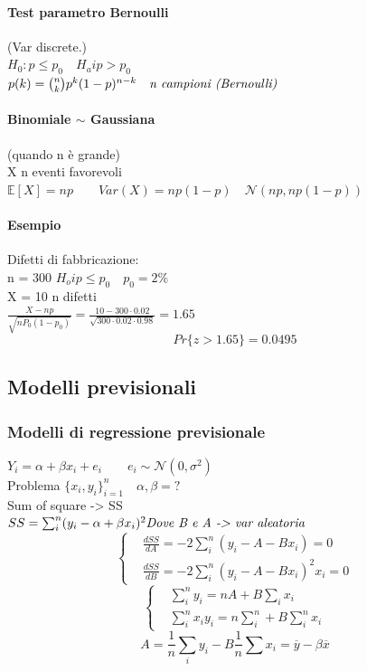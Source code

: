 \documentclass[]{article}
\newcommand{\ev}{\mathbb{E}[X]}
\renewcommand{\ev}[1]{\mathbb{E}\left[#1\right]}
\begin{document}
    \paragraph{Test parametro Bernoulli} (Var discrete.) \\
    $H_0 : p \leq p_0 \quad H_a i p > p_0$ \\[2ex]
    $p(k) = \binom{n}{k} p^k (1-p)^{n-k} \quad \text{\textit{n campioni (Bernoulli)}}$ \\[4ex]
    \paragraph{Binomiale $\sim$ Gaussiana} (quando n è grande) \\
    X n eventi favorevoli \\
    $\ev{X} = np \qquad Var(X) = np(1-p) \quad \mathcal{N}(np, np(1-p))$
    \paragraph{Esempio} Difetti di fabbricazione: \\
    n = 300 $H_o i p \leq p_0 \quad p_0 = 2\%$ \\
    X = 10 n difetti \\[2ex]
    $\displaystyle\frac{X-np}{\sqrt{nP_0(1-p_0)}} = \frac{10-300 \cdot 0.02}{\sqrt{300 \cdot 0.02 \cdot 0.98}} = 1.65$
    \[ Pr \{ z > 1.65 \} = 0.0495 \]
    \subsection{Modelli previsionali}
    \subsubsection{Modelli di regressione previsionale}
    $Y_i = \alpha + \beta x_i + e_i  \qquad e_i \sim \mathcal{N}(0, \sigma^2)$ \\[4ex]
    Problema $\{ x_i, y_i \}^n_{i=1} \quad \alpha, \beta = ?$ \\[4ex]
    Sum of square -> SS \\
    $SS = \sum_{i}^{n} (y_i - \alpha + \beta x_i)^2 \text{\textit{Dove B e A -> var aleatoria}}$ \\[2ex]
    \begin{equation*}
        \begin{cases}
            & \displaystyle\frac{dSS}{dA} = -2 \sum_{i}^{n} (y_i - A - Bx_i) = 0 \\
            & \displaystyle\frac{dSS}{dB} = -2 \sum_{i}^{n} (y_i - A - Bx_i)^2x_i = 0
        \end{cases} 
    \end{equation*}
    \begin{equation*}
        \begin{cases}
            & \displaystyle\sum_{i}^{n} y_i = nA + B \sum_{i}^{} x_i \\
            & \displaystyle\sum_{i}^{n} x_i y_i = n \sum_{i}^{n} + B \sum_{i}^{n} x_i
        \end{cases} 
    \end{equation*}
    \[ A = \frac{1}{n} \sum_{i}^{} y_i - B\frac{1}{n} \sum_{}^{} x_i = \overline{y} - \beta \overline{x} \]
\end{document}
